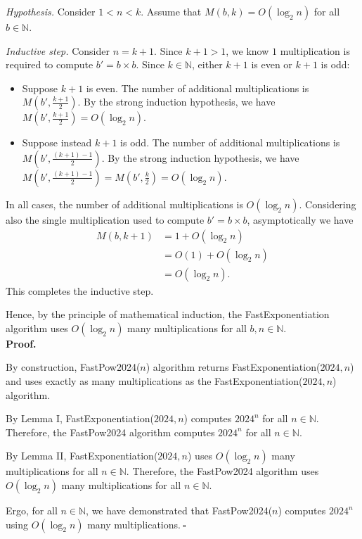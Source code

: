 \begin{enumerate}
\begin{solution}
\textit{Hypothesis. }Consider $1<n<k$. Assume that $M(b,k)=O(\log_2 n)$ for all $b\in\mathbb{N}$.

\textit{Inductive step. }Consider $n=k+1$. Since $k+1>1$, we know $1$ multiplication is required to compute $b'=b\times b$. Since $k\in\mathbb{N}$, either $k+1$ is even or $k+1$ is odd:
\begin{itemize}
\item Suppose $k+1$ is even. The number of additional multiplications is $M\left(b',\frac{k+1}{2}\right)$. By the strong induction hypothesis, we have $M\left(b',\frac{k+1}{2}\right)=O(\log_2n)$.
\item Suppose instead $k+1$ is odd. The number of additional multiplications is $M\left(b',\frac{(k+1)-1}{2}\right)$. By the strong induction hypothesis, we have $M\left(b',\frac{(k+1)-1}{2}\right)=M\left(b',\frac{k}{2}\right)=O(\log_2n)$.
\end{itemize}
In all cases, the number of additional multiplications is $O(\log_2n)$. Considering also the single multiplication used to compute $b'=b\times b$, asymptotically we have
\begin{align*}
M(b,k+1)&=1+O(\log_2n)\\
&=O(1)+O(\log_2n)\\
&=O(\log_2n).
\end{align*}
This completes the inductive step.

Hence, by the principle of mathematical induction, the {\sc FastExponentiation} algorithm uses $O(\log_2n)$ many multiplications for all $b,n\in\mathbb{N}$.\\

\textbf{Proof.}

By construction, {\sc FastPow2024}($n$) algorithm returns {\sc FastExponentiation}($2024,n$) and uses exactly as many multiplications as the {\sc FastExponentiation}($2024,n$) algorithm.

By Lemma I, {\sc FastExponentiation}($2024,n$) computes $2024^n$ for all $n\in\mathbb{N}$. Therefore, the {\sc FastPow2024} algorithm computes $2024^n$ for all $n\in\mathbb{N}$.

By Lemma II, {\sc FastExponentiation}($2024,n$) uses $O(\log_2n)$ many multiplications for all $n\in\mathbb{N}$. Therefore, the {\sc FastPow2024} algorithm uses $O(\log_2n)$ many multiplications for all $n\in\mathbb{N}$.

Ergo, for all $n\in\mathbb{N}$, we have demonstrated that {\sc FastPow2024}($n$) computes $2024^n$ using $O(\log_2n)$ many multiplications.$~\square$
\end{solution}
\newpage
\end{enumerate}
